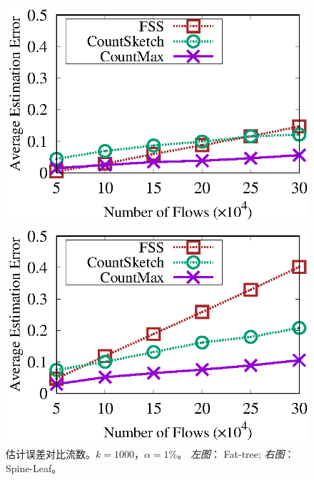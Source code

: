 \begin{figure}[!t]
	\centering
	\begin{minipage}[t]{0.49\linewidth}
		\centering
		\includegraphics[width=\linewidth]{fig/ft_flow_appr_1000_099.eps}
	\end{minipage}\vspace{-0.6em}%
	\begin{minipage}[t]{0.49\linewidth}
		\centering
		\includegraphics[width=\linewidth]{fig/hy_flow_appr_1000_099.eps}
	\end{minipage}\vspace{-0.6em}
	\caption{\textnormal{估计误差对比流数。$k=1000$，$\alpha = 1\%$。 \textit{左图}： Fat-tree; \textit{右图}： Spine-Leaf。}}
	\label{fig:acc,f,1000,1}
\end{figure}


